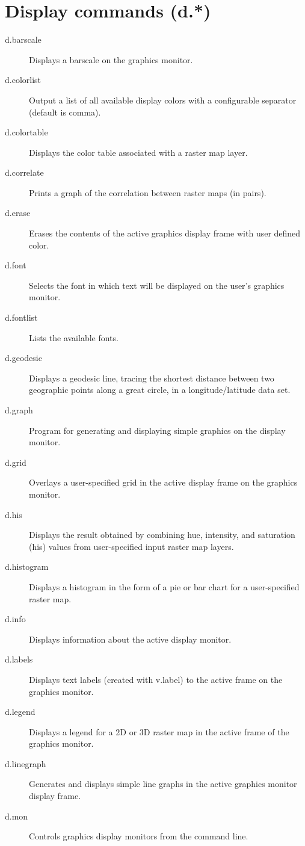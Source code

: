 
\section{Display commands (d.{*})}
\begin{description}
\item [{d.barscale}] Displays a barscale on the graphics monitor.
\item [{d.colorlist}] Output a list of all available display colors with
a configurable separator (default is comma).
\item [{d.colortable}] Displays the color table associated with a raster
map layer.
\item [{d.correlate}] Prints a graph of the correlation between raster
maps (in pairs).
\item [{d.erase}] Erases the contents of the active graphics display frame
with user defined color.
\item [{d.font}] Selects the font in which text will be displayed on the
user's graphics monitor.
\item [{d.fontlist}] Lists the available fonts.
\item [{d.geodesic}] Displays a geodesic line, tracing the shortest distance
between two geographic points along a great circle, in a longitude/latitude
data set.
\item [{d.graph}] Program for generating and displaying simple graphics
on the display monitor.
\item [{d.grid}] Overlays a user-specified grid in the active display frame
on the graphics monitor.
\item [{d.his}] Displays the result obtained by combining hue, intensity,
and saturation (his) values from user-specified input raster map layers.
\item [{d.histogram}] Displays a histogram in the form of a pie or bar
chart for a user-specified raster map.
\item [{d.info}] Displays information about the active display monitor.
\item [{d.labels}] Displays text labels (created with v.label) to the active
frame on the graphics monitor.
\item [{d.legend}] Displays a legend for a 2D or 3D raster map in the active
frame of the graphics monitor.
\item [{d.linegraph}] Generates and displays simple line graphs in the
active graphics monitor display frame.
\item [{d.mon}] Controls graphics display monitors from the command line.

\end{description}
